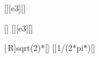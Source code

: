 [\kilo\hertz][e3][\hertz]

[\ohm]
[\kilo\hertz][e3][\hertz]

[\,R]{sqrt(2)*\RX}[\ohm]
[]{1/(2*pi*\fxX*\RX)}[\farad]
